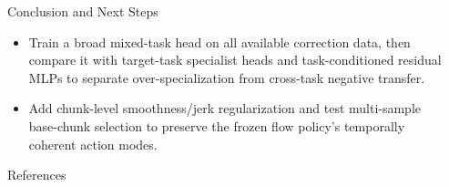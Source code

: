 \documentclass[final]{beamer}
\newlength{\sepwidth}
\newlength{\colwidth}
\newcommand{\separatorcolumn}{\begin{column}{\sepwidth}\end{column}}
\begin{document}
\begin{frame}[t]
\begin{columns}[t]
\begin{column}{\colwidth}
\begin{block}{Conclusion and Next Steps}
\begin{itemize}
					\item Train a broad mixed-task head
					on all available correction data, then compare it with target-task
					specialist heads and task-conditioned residual MLPs to separate
					over-specialization from cross-task negative transfer.
			
					\item Add chunk-level smoothness/jerk
					regularization and test multi-sample base-chunk selection to preserve the
					frozen flow policy's temporally coherent action modes.
				\end{itemize}
			\end{block}

			\begin{block}{References}
				\scriptsize
				\nocite{Bai2025OpenPIComet}
				\nocite{PhysicalIntelligence2025Pi05}
				\nocite{Sendai2025A2C2}
				\printbibliography[heading=none]
			\end{block}
		\end{column}

		\separatorcolumn
	\end{columns}
\end{frame}
\end{document}
